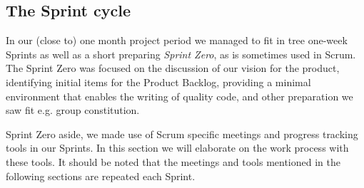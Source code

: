 \subsection{The Sprint cycle}

In our (close to) one month project period we managed to fit in tree one-week Sprints as well as a short preparing \textit{Sprint Zero}, as is sometimes used in Scrum. The Sprint Zero was focused on the discussion of our vision for the product, identifying initial items for the Product Backlog, providing a minimal environment that enables the  writing of quality code, and other preparation we saw fit e.g. group constitution.

Sprint Zero aside, we made use of Scrum specific meetings and progress tracking tools in our Sprints. In this section we will elaborate on the work process with these tools. It should be noted that the meetings and tools mentioned in the following sections are repeated each Sprint.







